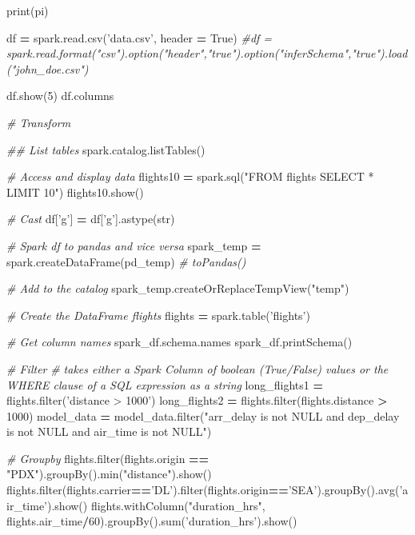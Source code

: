 \documentclass[]{book}
\newenvironment{Shaded}{\begin{snugshade}}{\end{snugshade}}
\newcommand{\BuiltInTok}[1]{#1}
\newcommand{\CommentTok}[1]{\textcolor[rgb]{0.56,0.35,0.01}{\textit{#1}}}
\newcommand{\DecValTok}[1]{\textcolor[rgb]{0.00,0.00,0.81}{#1}}
\newcommand{\NormalTok}[1]{#1}
\newcommand{\OperatorTok}[1]{\textcolor[rgb]{0.81,0.36,0.00}{\textbf{#1}}}
\newcommand{\StringTok}[1]{\textcolor[rgb]{0.31,0.60,0.02}{#1}}
\newcommand{\VariableTok}[1]{\textcolor[rgb]{0.00,0.00,0.00}{#1}}
\begin{document}
\begin{Shaded}
\begin{Highlighting}[]
\BuiltInTok{print}\NormalTok{(pi)}

\NormalTok{df }\OperatorTok{=}\NormalTok{ spark.read.csv(}\StringTok{'data.csv'}\NormalTok{, header }\OperatorTok{=} \VariableTok{True}\NormalTok{)}
\CommentTok{#df = spark.read.format("csv").option("header","true").option("inferSchema","true").load("john_doe.csv")}

\NormalTok{df.show(}\DecValTok{5}\NormalTok{)}
\NormalTok{df.columns}

\CommentTok{# Transform}

\CommentTok{## List tables}
\NormalTok{spark.catalog.listTables()}

\CommentTok{# Access and display data}
\NormalTok{flights10 }\OperatorTok{=}\NormalTok{ spark.sql(}\StringTok{"FROM flights SELECT * LIMIT 10"}\NormalTok{)}
\NormalTok{flights10.show()}

\CommentTok{# Cast}
\NormalTok{df[}\StringTok{'g'}\NormalTok{] }\OperatorTok{=}\NormalTok{ df[}\StringTok{'g'}\NormalTok{].astype(}\BuiltInTok{str}\NormalTok{)}

\CommentTok{# Spark df to pandas and vice versa}
\NormalTok{spark_temp }\OperatorTok{=}\NormalTok{ spark.createDataFrame(pd_temp) }\CommentTok{# toPandas()}

\CommentTok{# Add to the catalog}
\NormalTok{spark_temp.createOrReplaceTempView(}\StringTok{"temp"}\NormalTok{)}

\CommentTok{# Create the DataFrame flights}
\NormalTok{flights }\OperatorTok{=}\NormalTok{ spark.table(}\StringTok{'flights'}\NormalTok{)}

\CommentTok{# Get column names}
\NormalTok{spark_df.schema.names}
\NormalTok{spark_df.printSchema()}

\CommentTok{# Filter}
\CommentTok{# takes either a Spark Column of boolean (True/False) values or the WHERE clause of a SQL expression as a string}
\NormalTok{long_flights1 }\OperatorTok{=}\NormalTok{ flights.}\BuiltInTok{filter}\NormalTok{(}\StringTok{'distance > 1000'}\NormalTok{)}
\NormalTok{long_flights2 }\OperatorTok{=}\NormalTok{ flights.}\BuiltInTok{filter}\NormalTok{(flights.distance }\OperatorTok{>} \DecValTok{1000}\NormalTok{)}
\NormalTok{model_data }\OperatorTok{=}\NormalTok{ model_data.}\BuiltInTok{filter}\NormalTok{(}\StringTok{"arr_delay is not NULL and dep_delay is not NULL and air_time is not NULL"}\NormalTok{)}

\CommentTok{# Groupby}
\NormalTok{flights.}\BuiltInTok{filter}\NormalTok{(flights.origin }\OperatorTok{==} \StringTok{"PDX"}\NormalTok{).groupBy().}\BuiltInTok{min}\NormalTok{(}\StringTok{"distance"}\NormalTok{).show()}
\NormalTok{flights.}\BuiltInTok{filter}\NormalTok{(flights.carrier}\OperatorTok{==}\StringTok{'DL'}\NormalTok{).}\BuiltInTok{filter}\NormalTok{(flights.origin}\OperatorTok{==}\StringTok{'SEA'}\NormalTok{).groupBy().avg(}\StringTok{'air_time'}\NormalTok{).show()}
\NormalTok{flights.withColumn(}\StringTok{"duration_hrs"}\NormalTok{, flights.air_time}\OperatorTok{/}\DecValTok{60}\NormalTok{).groupBy().}\BuiltInTok{sum}\NormalTok{(}\StringTok{'duration_hrs'}\NormalTok{).show()}


\end{Highlighting}
\end{Shaded}
\end{document}
